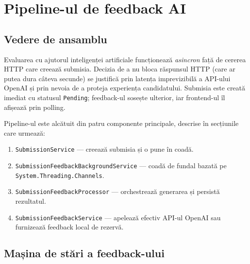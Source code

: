 
\section{Pipeline-ul de feedback AI}
\label{sec:pipeline_feedback_ai}

\subsection{Vedere de ansamblu}

Evaluarea cu ajutorul inteligenței artificiale funcționează \emph{asincron}
față de cererea HTTP care creează submisia. Decizia de a nu bloca
răspunsul HTTP (care ar putea dura câteva secunde) se justifică prin
latența imprevizibilă a API-ului OpenAI și prin nevoia de a proteja
experiența candidatului. Submisia este creată imediat cu statusul
\texttt{Pending}; feedback-ul sosește ulterior, iar frontend-ul îl afișează
prin polling.

Pipeline-ul este alcătuit din patru componente principale, descrise în
secțiunile care urmează:

\begin{enumerate}
  \item \texttt{SubmissionService} — creează submisia și o pune în coadă.
  \item \texttt{SubmissionFeedbackBackgroundService} — coadă de fundal
        bazată pe \texttt{System.Threading.Channels}.
  \item \texttt{SubmissionFeedbackProcessor} — orchestrează generarea și
        persistă rezultatul.
  \item \texttt{SubmissionFeedbackService} — apelează efectiv API-ul
        OpenAI sau furnizează feedback local de rezervă.
\end{enumerate}

\subsection{Mașina de stări a feedback-ului}

